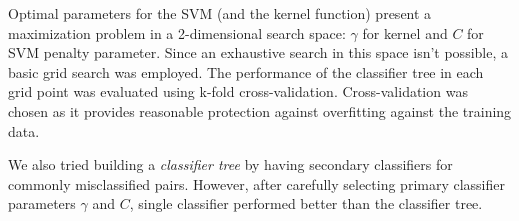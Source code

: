 \documentclass{netsec2012}
\begin{document}
Optimal parameters for the SVM (and the kernel function) present a maximization problem in a 
2-dimensional search space: $\gamma$ for kernel and $C$ for SVM penalty parameter.  Since an exhaustive search 
in this space isn't possible, a basic grid search was employed.  The performance of the classifier 
tree in each grid point was evaluated using k-fold cross-validation.  Cross-validation was chosen as 
it provides reasonable protection against overfitting against the training data.

We also tried building a \emph{classifier tree} by having secondary classifiers for commonly 
misclassified pairs. However, after carefully selecting primary classifier parameters $\gamma$ and 
$C$, single classifier performed better than the classifier tree.



\end{document}

